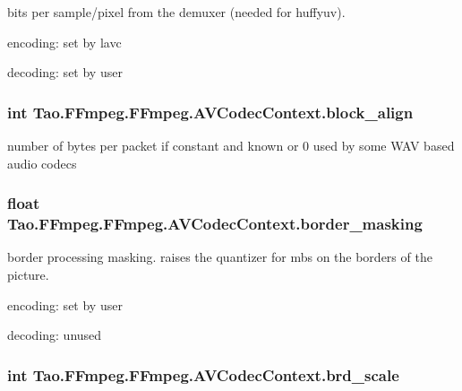 \label{struct_tao_1_1_f_fmpeg_1_1_f_fmpeg_1_1_a_v_codec_context_a454b690eac52e8344e0001a10657ba56}
bits per sample/pixel from the demuxer (needed for huffyuv).
\begin{DoxyItemize}
\item encoding: set by lavc
\item decoding: set by user 
\end{DoxyItemize}\hypertarget{struct_tao_1_1_f_fmpeg_1_1_f_fmpeg_1_1_a_v_codec_context_a238a87a1e941c7ab6f0a3922b88bbace}{
\subsubsection[{block\_\-align}]{\setlength{\rightskip}{0pt plus 5cm}int {\bf Tao.FFmpeg.FFmpeg.AVCodecContext.block\_\-align}}}
\label{struct_tao_1_1_f_fmpeg_1_1_f_fmpeg_1_1_a_v_codec_context_a238a87a1e941c7ab6f0a3922b88bbace}
number of bytes per packet if constant and known or 0 used by some WAV based audio codecs \hypertarget{struct_tao_1_1_f_fmpeg_1_1_f_fmpeg_1_1_a_v_codec_context_a47d06f0349212a16761d391261d38473}{
\subsubsection[{border\_\-masking}]{\setlength{\rightskip}{0pt plus 5cm}float {\bf Tao.FFmpeg.FFmpeg.AVCodecContext.border\_\-masking}}}
\label{struct_tao_1_1_f_fmpeg_1_1_f_fmpeg_1_1_a_v_codec_context_a47d06f0349212a16761d391261d38473}
border processing masking. raises the quantizer for mbs on the borders of the picture.
\begin{DoxyItemize}
\item encoding: set by user
\item decoding: unused 
\end{DoxyItemize}\hypertarget{struct_tao_1_1_f_fmpeg_1_1_f_fmpeg_1_1_a_v_codec_context_a36fd3df7e7e41910ca646486c0084d6c}{
\subsubsection[{brd\_\-scale}]{\setlength{\rightskip}{0pt plus 5cm}int {\bf Tao.FFmpeg.FFmpeg.AVCodecContext.brd\_\-scale}}}
\label{struct_tao_1_1_f_fmpeg_1_1_f_fmpeg_1_1_a_v_codec_context_a36fd3df7e7e41910ca646486c0084d6c}

